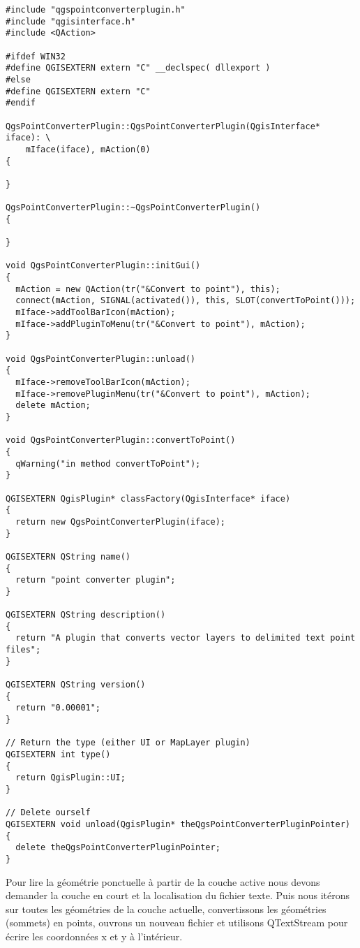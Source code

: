\begin{verbatim}
#include "qgspointconverterplugin.h"
#include "qgisinterface.h"
#include <QAction>

#ifdef WIN32
#define QGISEXTERN extern "C" __declspec( dllexport )
#else
#define QGISEXTERN extern "C"
#endif

QgsPointConverterPlugin::QgsPointConverterPlugin(QgisInterface* iface): \
    mIface(iface), mAction(0)
{

}

QgsPointConverterPlugin::~QgsPointConverterPlugin()
{

}

void QgsPointConverterPlugin::initGui()
{
  mAction = new QAction(tr("&Convert to point"), this);
  connect(mAction, SIGNAL(activated()), this, SLOT(convertToPoint()));
  mIface->addToolBarIcon(mAction);
  mIface->addPluginToMenu(tr("&Convert to point"), mAction);
}

void QgsPointConverterPlugin::unload()
{
  mIface->removeToolBarIcon(mAction);
  mIface->removePluginMenu(tr("&Convert to point"), mAction);
  delete mAction;
}

void QgsPointConverterPlugin::convertToPoint()
{
  qWarning("in method convertToPoint");
}

QGISEXTERN QgisPlugin* classFactory(QgisInterface* iface)
{
  return new QgsPointConverterPlugin(iface);
}

QGISEXTERN QString name()
{
  return "point converter plugin";
}

QGISEXTERN QString description()
{
  return "A plugin that converts vector layers to delimited text point files";
}

QGISEXTERN QString version()
{
  return "0.00001";
}

// Return the type (either UI or MapLayer plugin)
QGISEXTERN int type()
{
  return QgisPlugin::UI;
}

// Delete ourself
QGISEXTERN void unload(QgisPlugin* theQgsPointConverterPluginPointer)
{
  delete theQgsPointConverterPluginPointer;
}
\end{verbatim}



Pour lire la g\'eom\'etrie ponctuelle \`a partir de la couche active nous devons 
demander la couche en court et la localisation du fichier texte. Puis nous 
it\'erons sur toutes les g\'eom\'etries de la couche actuelle, convertissons les 
g\'eom\'etries (sommets) en points, ouvrons un nouveau fichier et utilisons 
QTextStream pour \'ecrire les coordonn\'ees x et y \`a l'int\'erieur.

